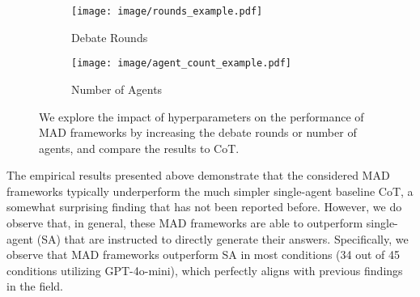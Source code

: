 \begin{figure}[tbp]
     \centering
     \begin{subfigure}[b]{0.98\textwidth}
         \centering
         \texttt{[image: image/rounds\_example.pdf]} 
         \caption{Debate Rounds}
         \label{fig:rounds}
     \end{subfigure}
     \vfill
     \begin{subfigure}[b]{0.98\textwidth}
         \centering
         \texttt{[image: image/agent\_count\_example.pdf]}
         \caption{Number of Agents}
         \label{fig:numOfAgents}
     \end{subfigure}
     \caption{We explore the impact of hyperparameters on the performance of MAD frameworks by increasing the debate rounds or number of agents, and compare the results to CoT.}
\end{figure}


 The empirical results presented above demonstrate that the considered  MAD frameworks typically underperform the much simpler single-agent baseline CoT, a somewhat surprising finding that has not been reported before.  
However, we do observe that, in general, these MAD frameworks are able to outperform single-agent (SA) that are instructed to directly generate their answers. 
Specifically, we observe that MAD frameworks outperform SA in most conditions (34 out of 45 conditions utilizing GPT-4o-mini), which perfectly aligns with previous findings in the field. 

